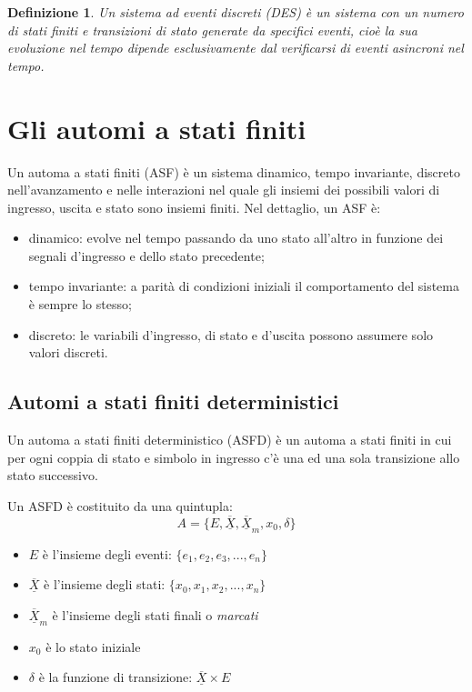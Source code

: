 \documentclass[a4paper]{report}
\newtheorem{definizione}{Definizione}
\begin{document}
\begin{definizione}\label{def:DES}
  Un sistema ad eventi discreti (DES) \`e un sistema con un numero di
  stati finiti e transizioni di stato generate da specifici eventi,
  cio\`e la sua evoluzione nel tempo dipende esclusivamente dal
  verificarsi di eventi asincroni nel tempo.
\end{definizione}

\section{Gli automi a stati finiti}
Un automa a stati finiti (ASF) \`e un sistema dinamico, tempo invariante,
discreto nell'avanzamento e nelle interazioni nel quale gli insiemi
dei possibili valori di ingresso, uscita e stato sono insiemi finiti.
Nel dettaglio, un ASF \`e:
\begin{itemize}
\item dinamico: evolve nel tempo passando da uno stato all'altro in
  funzione dei segnali d'ingresso e dello stato precedente;
\item tempo invariante: a parit\`a di condizioni iniziali il
  comportamento del sistema \`e sempre lo stesso;
\item discreto: le variabili d'ingresso, di stato e d'uscita possono
  assumere solo valori discreti.
\end{itemize}

\subsection{Automi a stati finiti deterministici}
Un automa a stati finiti deterministico (ASFD) \`e un automa a stati
finiti in cui per ogni coppia di stato e simbolo in ingresso c'\`e una
ed una sola transizione allo stato successivo.

Un ASFD \`e costituito da una quintupla:
\begin{equation}
  A = \{ E, \overline{\underline{X}}, \overline{\underline{X}}_m, x_0,
  \delta \}
\end{equation}
\begin{itemize}
\item $E$ \`e l'insieme degli eventi: $\{ e_1, e_2, e_3, ..., e_n\}$
\item $\overline{\underline{X}}$ \`e l'insieme degli stati: $\{ x_0, x_1,
  x_2, ..., x_n\}$
\item $\overline{\underline{X}}_m$ \`e l'insieme degli stati finali o {\em
  marcati}
\item $x_0$ \`e lo stato iniziale
\item $\delta$ \`e la funzione di transizione: $\overline{\underline{X}}
  \times E$
\end{itemize}
\end{document}
